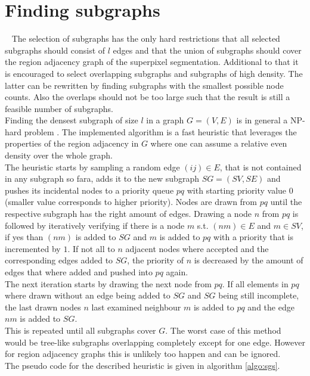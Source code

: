 \section{Finding subgraphs}~\label{seg:sag_gcn}
The selection of subgraphs has the only hard restrictions that all selected subgraphs should consist of $l$ edges and that the union of subgraphs should cover the region adjacency graph of the superpixel segmentation. Additional to that it is encouraged to select overlapping subgraphs and subgraphs of high density. The latter can be rewritten by finding subgraphs with the smallest possible node counts. Also the overlaps should not be too large such that the result is still a feasible number of subgraphs. \\
Finding the densest subgraph of size $l$ in a graph $G=(V,E)$ is in general a NP-hard problem \cite{densestSg}. The implemented algorithm is a fast heuristic that leverages the properties of the region adjacency in $G$ where one can assume a relative even density over the whole graph.\\
The heuristic starts by sampling a random edge $(ij)\in E$, that is not contained in any subgraph so fara, adds it to the new subgraph $SG=(SV,SE)$ and pushes its incidental nodes to a priority queue $pq$ with starting priority value $0$ (smaller value corresponds to higher priority). Nodes are drawn from $pq$ until the respective subgraph has the right amount of edges. Drawing a node $n$ from $pq$ is followed by iteratively verifying if there is a node $m$ s.t. $(nm)\in E$ and $m\in SV$, if yes than $(nm)$ is added to $SG$ and $m$ is added to $pq$ with a priority that is incremented by $1$. If not all to $n$ adjacent nodes where accepted and the corresponding edges added to $SG$, the priority of $n$ is decreased by the amount of edges that where added and pushed into $pq$ again.\\
The next iteration starts by drawing the next node from $pq$. If all elements in $pq$ where drawn without an edge being added to $SG$ and $SG$ being still incomplete, the last drawn nodes $n$ last examined neighbour $m$ is added to $pq$ and  the edge $nm$ is added to $SG$.\\
This is repeated until all subgraphs cover $G$. The worst case of this method would be tree-like subgraphs overlapping completely except for one edge. However for region adjacency graphs this is unlikely too happen and can be ignored.\\
The pseudo code for the described heuristic is given in algorithm \ref{algo:sgs}.\\
